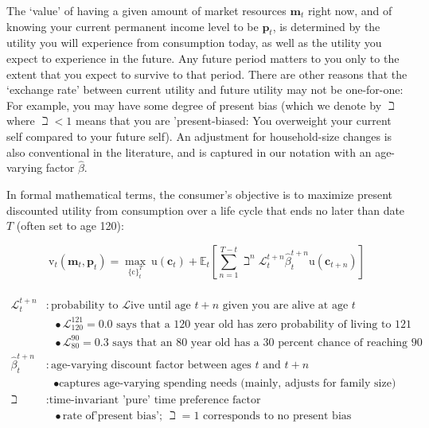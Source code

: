 \documentclass{article}
\newcommand{\uFunc}{\mathrm{u}}
\newcommand{\pLvl}{\mathbf{p}}
\newcommand{\mLvl}{\mathbf{m}}
\newcommand{\DiscFac}{\beta}
\newcommand{\cFunc}{\mathrm{c}}
\newcommand{\vFunc}{\mathrm{v}}
\newcommand{\Alive}{\mathcal{L}}
\newcommand{\cLvl}{\mathbf{c}}
\newcommand{\Ex}{\mathbb{E}}
\begin{document}
The `value' of having a given amount of market resources $\mLvl_{t}$ right now, and of knowing your current permanent income level to be $\pLvl_{t}$, is determined by the utility you will experience from consumption today, as well as the utility you expect to experience in the future. Any future period matters to you only to the extent that you expect to survive to that period. There are other reasons that the `exchange rate' between current utility and future utility may not be one-for-one: For example, you may have some degree of present bias (which we denote by $\beth$ where $\beth < 1$ means that you are 'present-biased: You overweight your current self compared to your future self). An adjustment for household-size changes is also conventional in the literature, and is captured in our notation with an age-varying factor $\hat{\DiscFac}$.

In formal mathematical terms, the consumer's objective is to maximize present discounted utility from consumption over a life cycle that ends no later than date $T$ (often set to age 120):

\begin{equation}
\label{eq:lifecyclemax}
\pmb{\vFunc}_{t}(\mLvl_{t},\pLvl_{t}) = \max_{\{\cFunc\}_{t}^{T}} ~ \uFunc(\cLvl_{t})+\Ex_{t}\left[\sum_{n=1}^{T-t} {\beth}^{n} \Alive_{t}^{t+n}\hat{\DiscFac}_{t}^{t+n} \uFunc(\cLvl_{t+n}) \right]
\end{equation}

\begin{equation}
\begin{align}
    \\ \Alive _{t}^{t+n} & : \text{probability to }\Alive\text{ive until age $t+n$ given you are alive at age $t$}
    \\ & {~~~}\bullet \text{$\Alive_{120}^{121} = 0.0$ says that a 120 year old has zero probability of living to 121}
    \\ & {~~~}\bullet \text{$\Alive_{80}^{90} = 0.3$ says that an 80 year old has a 30 percent chance of reaching 90}
    \\ \hat{\DiscFac}_{t}^{t+n} & : \text{age-varying discount factor between ages $t$ and $t+n$}
    \\ & {~~~} \bullet \text{captures age-varying spending needs (mainly, adjusts for family size)}
    \\ \beth & : \text{time-invariant 'pure' time preference factor}
    \\ & {~~~} \bullet \text{rate of'present bias'; $\beth=1$ corresponds to no present bias}
\end{align}
\end{equation}
\end{document}
